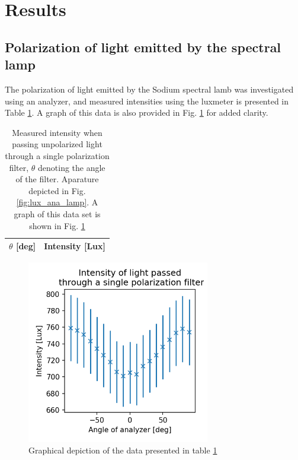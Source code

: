 \documentclass[11pt,a4paper, twocolumn]{article}
\begin{document}
\section{\label{sect:results}Results}
  
  \subsection{Polarization of light emitted by the spectral lamp}

  The polarization of light emitted by the Sodium spectral lamb was investigated using an analyzer, and measured intensities using the luxmeter is presented in Table \ref{tab:ana}. A graph of this data is also provided in Fig. \ref{fig:ana_plot} for added clarity.

  \begin{table}[H]
      \center
      \caption{Measured intensity when passing unpolarized light through a single polarization filter, $\theta$ denoting the angle of the filter. Aparature depicted in Fig. \ref{fig:lux_ana_lamp}. A graph of this data set is shown in Fig. \ref{fig:ana_plot}}
       \begin{tabular}{r | l}
        $\theta$ [deg] & Intensity [Lux] \\ \hline
         
       \end{tabular}
       \label{tab:ana}
  \end{table}

  \begin{figure}[H]
    \center
    \includegraphics[width=8cm]{scripts/polartest.png}
    \caption{Graphical depiction of the data presented in table \ref{tab:ana}}
    \label{fig:ana_plot}
  \end{figure}
\end{document}
